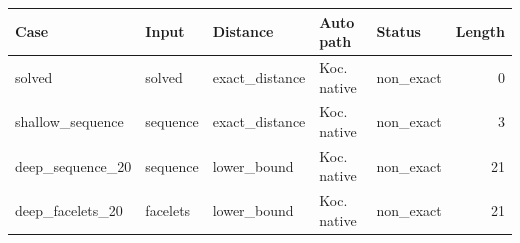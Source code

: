 {\small
\begin{tabular}{L{0.20\textwidth}L{0.12\textwidth}L{0.18\textwidth}L{0.14\textwidth}L{0.12\textwidth}r}
\hline
Case & Input & Distance & Auto path & Status & Length \\
\hline
solved & solved & exact\_distance & Koc. native & non\_exact & 0 \\
shallow\_sequence & sequence & exact\_distance & Koc. native & non\_exact & 3 \\
deep\_sequence\_20 & sequence & lower\_bound & Koc. native & non\_exact & 21 \\
deep\_facelets\_20 & facelets & lower\_bound & Koc. native & non\_exact & 21 \\
\hline
\end{tabular}
}
